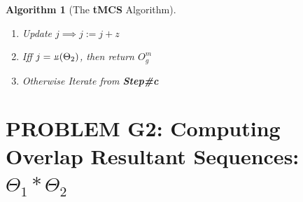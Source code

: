 \documentclass[a4paper, 18pt]{book} %
\newtheorem{alg}{Algorithm}
\newcommand{\invpi}{\rotatebox[origin=c]{180}{$\pi$}}
\begin{document}
\begin{alg}[The \textbf{tMCS} Algorithm]
\begin{enumerate}
{\begin{enumerate}
{ for some $k \in [1,\invpi(\Theta_1)]$ and $l \in [1,\invpi(\Theta_2)]$.
 
 Create another array of maximum length $m$, $O^m$, which contains at most m elements generated thus:
 \begin{itemize}
 \item $O^m[i]$ contains 0 if the corresponding two elements in $\Theta_1$ and $\Theta_2$ didn't match. Otherwise it contains the matching element value from the first sequence --- or rather, $f(a_{1,k},a_{2,l}) = a_{1,k}$ iff $a_{1,k} == a_{2,l}$.
 \item truncate $O^m$ to its longest non-zero/non-empty subsequence, set that as $O^m$.
 \item Iff $\invpi(O^m) > \invpi(O^m_g)$, then \textbf{Update} or replace $O^m_g$ with $O^m$\\ $\implies$  $O^m_g := O^m$
 \end{itemize}
}
\item{
Update $j \implies j := j + z$
}
\item {
Iff $j = \invpi(\Theta_2)$, then return $O^m_g$
}
\item{Otherwise Iterate from \textbf{Step\#c}}
\end{enumerate}
}
\end{enumerate}
\end{alg}


\section{PROBLEM G2: Computing Overlap Resultant Sequences: $\Theta_1 \ast \Theta_2$}
\label{PROBG2}
\end{document}
